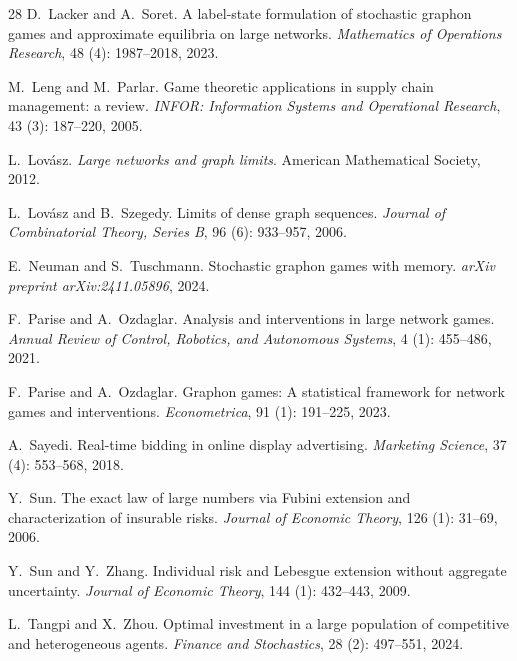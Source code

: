 \documentclass[11pt]{article}
\numberwithin{equation}{section}
\begin{document}
\begin{thebibliography}{28}
D.~Lacker and A.~Soret.
\newblock A label-state formulation of stochastic graphon games and approximate equilibria on large networks.
\newblock \emph{Mathematics of Operations Research}, 48 (4): 1987--2018, 2023.

M.~Leng and M.~Parlar.
\newblock Game theoretic applications in supply chain management: a review.
\newblock \emph{INFOR: Information Systems and Operational Research}, 43 (3): 187--220, 2005.

L.~Lov{\'a}sz.
\newblock \emph{Large networks and graph limits}.
\newblock American Mathematical Society, 2012.

L.~Lov{\'a}sz and B.~Szegedy.
\newblock Limits of dense graph sequences.
\newblock \emph{Journal of Combinatorial Theory, Series B}, 96 (6): 933--957, 2006.

E.~Neuman and S.~Tuschmann.
\newblock Stochastic graphon games with memory.
\newblock \emph{arXiv preprint arXiv:2411.05896}, 2024.

F.~Parise and A.~Ozdaglar.
\newblock Analysis and interventions in large network games.
\newblock \emph{Annual Review of Control, Robotics, and Autonomous Systems}, 4 (1): 455--486, 2021.

F.~Parise and A.~Ozdaglar.
\newblock Graphon games: A statistical framework for network games and interventions.
\newblock \emph{Econometrica}, 91 (1): 191--225, 2023.

A.~Sayedi.
\newblock Real-time bidding in online display advertising.
\newblock \emph{Marketing Science}, 37 (4): 553--568, 2018.

Y.~Sun.
\newblock The exact law of large numbers via {Fubini} extension and characterization of insurable risks.
\newblock \emph{Journal of Economic Theory}, 126 (1): 31--69, 2006.

Y.~Sun and Y.~Zhang.
\newblock Individual risk and {Lebesgue} extension without aggregate uncertainty.
\newblock \emph{Journal of Economic Theory}, 144 (1): 432--443, 2009.

L.~Tangpi and X.~Zhou.
\newblock Optimal investment in a large population of competitive and heterogeneous agents.
\newblock \emph{Finance and Stochastics}, 28 (2): 497--551, 2024.

\end{thebibliography}
\end{document}
